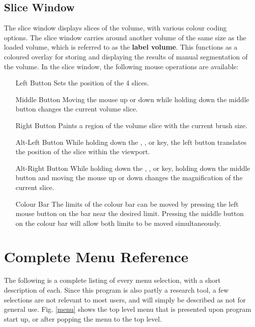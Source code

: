 \subsection{Slice Window}

The slice window displays slices of the volume, with various colour coding
options.  The slice window carries around another volume of the same size
as the loaded volume, which is referred to as the {\bf label volume}.
This functions as a coloured overlay for storing and displaying the results
of manual segmentation of the volume.
In the slice window, the following mouse operations are available:

\begin{itemize}
\item[Left Button]  Sets the position of the 4 slices.
\item[Middle Button]  Moving the mouse up or down while holding down the
                      middle button changes the current volume slice.
\item[Right Button]  Paints a region of the volume slice with the current
                     brush size.
\item[Alt-Left Button]  While holding down the , ,
                        or  key, the left button translates the
                        position of the slice within the viewport.
\item[Alt-Right Button]  While holding down the , ,
                        or  key, holding down the middle button
                        and moving the mouse up or down changes the
                        magnification of the current slice.
\item[Colour Bar]  The limits of the colour bar can be moved by pressing
                   the left mouse button on the bar near the desired limit.
                   Pressing the middle button on the colour bar will allow
                   both limits to be moved simultaneously.
\end{itemize}

\section{Complete Menu Reference}


The following is a complete listing of every menu selection, with a
short description of each.
Since this program is also partly a research tool, a few selections are
not relevant to most users, and will simply be described as not for general
use.  Fig. \ref{menu} shows the top level menu that is presented upon
program start up, or after popping the menu to the top level.

